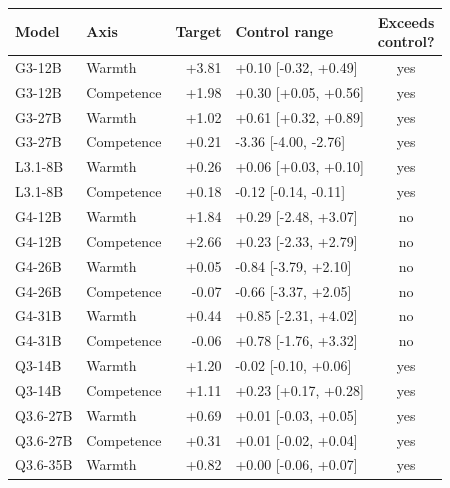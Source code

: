 \begin{table}[H]
\centering
\scriptsize
\setlength{\tabcolsep}{1.2pt}
\begin{tabular}{@{}llrlc@{}}
\toprule
Model & Axis & Target & Control range & \shortstack{Exceeds\\control?} \\
\midrule
G3-12B & Warmth & +3.81 & +0.10 [-0.32, +0.49] & yes \\
G3-12B & Competence & +1.98 & +0.30 [+0.05, +0.56] & yes \\
G3-27B & Warmth & +1.02 & +0.61 [+0.32, +0.89] & yes \\
G3-27B & Competence & +0.21 & -3.36 [-4.00, -2.76] & yes \\
L3.1-8B & Warmth & +0.26 & +0.06 [+0.03, +0.10] & yes \\
L3.1-8B & Competence & +0.18 & -0.12 [-0.14, -0.11] & yes \\
G4-12B & Warmth & +1.84 & +0.29 [-2.48, +3.07] & no \\
G4-12B & Competence & +2.66 & +0.23 [-2.33, +2.79] & no \\
G4-26B & Warmth & +0.05 & -0.84 [-3.79, +2.10] & no \\
G4-26B & Competence & -0.07 & -0.66 [-3.37, +2.05] & no \\
G4-31B & Warmth & +0.44 & +0.85 [-2.31, +4.02] & no \\
G4-31B & Competence & -0.06 & +0.78 [-1.76, +3.32] & no \\
Q3-14B & Warmth & +1.20 & -0.02 [-0.10, +0.06] & yes \\
Q3-14B & Competence & +1.11 & +0.23 [+0.17, +0.28] & yes \\
Q3.6-27B & Warmth & +0.69 & +0.01 [-0.03, +0.05] & yes \\
Q3.6-27B & Competence & +0.31 & +0.01 [-0.02, +0.04] & yes \\
Q3.6-35B & Warmth & +0.82 & +0.00 [-0.06, +0.07] & yes \\

\end{tabular}
\end{table}
